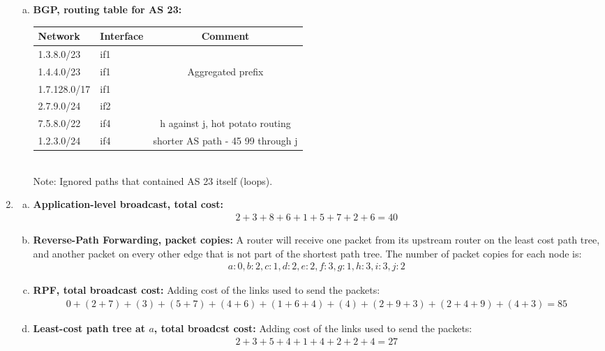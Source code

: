 \documentclass[11pt]{article}
\begin{document}
\begin{enumerate}[1.]
\begin{enumerate}[(a)]
  \item
  \textbf{
     BGP, routing table for AS 23:
  }
  
  \begin{tabular}{|l|l|c|}
    \hline
    Network & Interface & Comment \\
    \hline
    1.3.8.0/23 & if1 & \\
    1.4.4.0/23 & if1 & Aggregated prefix \\
    1.7.128.0/17 & if1 & \\
    2.7.9.0/24 & if2 & \\
    7.5.8.0/22 & if4 & h against j, hot potato routing \\
    1.2.3.0/24 & if4 & shorter AS path - 45 99 through j\\
    \hline
  \end{tabular} \\
  Note: Ignored paths that contained AS 23 itself (loops).
  \end{enumerate}

\item %
  \begin{enumerate}[(a)]
  \item
  \textbf{
    Application-level broadcast, total cost:
  }
  \begin{align*}
    2 + 3 + 8 + 6 + 1 + 5 + 7 + 2 + 6 = 40
  \end{align*}

  \item
  \textbf{
    Reverse-Path Forwarding, packet copies: 
  } 
  A router will receive one packet from its upstream router on the least cost path tree, and another packet on every other edge that is not part of the shortest path tree. The number of packet copies for each node is:
  \begin{align*}
    a:0, b:2, c:1, d:2, e:2, f:3, g:1, h:3, i:3, j:2
  \end{align*}

  \item
  \textbf{
    RPF, total broadcast cost:
  } Adding cost of the links used to send the packets:
  \begin{align*}
    0 + (2+7) + (3) + (5+7) + (4+6) + (1+6+4) + (4) + (2+9+3) + (2+4+9) + (4+3) = 85
  \end{align*}

  \item
  \textbf{
    Least-cost path tree at $a$, total broadcst cost:
  } Adding cost of the links used to send the packets:
  \begin{align*}
    2 + 3 + 5 + 4 + 1 + 4 + 2 + 2 + 4 = 27
  \end{align*}

  \end{enumerate}
\end{enumerate}
\end{document}
